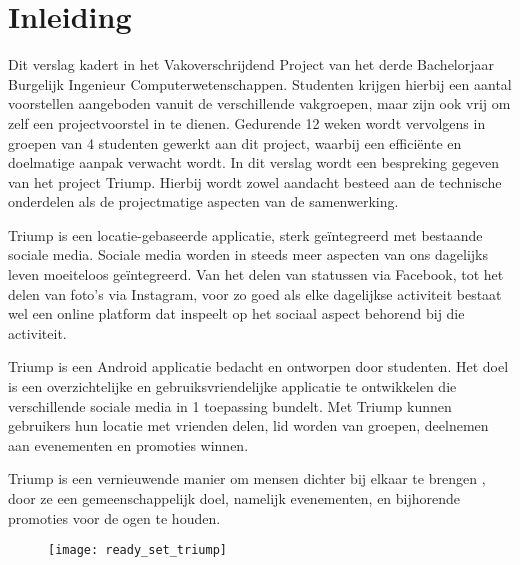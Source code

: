 \chapter{Inleiding}
Dit verslag kadert in het Vakoverschrijdend Project van het derde Bachelorjaar Burgelijk Ingenieur Computerwetenschappen. Studenten krijgen hierbij een aantal voorstellen aangeboden vanuit de verschillende vakgroepen, maar zijn ook vrij om zelf een projectvoorstel in te dienen. Gedurende 12 weken wordt vervolgens in groepen van 4 studenten gewerkt aan dit project, waarbij een efficiënte en doelmatige aanpak verwacht wordt. In dit verslag wordt een bespreking gegeven van het project Triump. Hierbij wordt zowel aandacht besteed aan de technische onderdelen als de projectmatige aspecten van de samenwerking.


Triump is een locatie-gebaseerde applicatie, sterk geïntegreerd met bestaande sociale media.
Sociale media worden in steeds meer aspecten van ons dagelijks leven moeiteloos geïntegreerd. Van het delen van statussen via Facebook, tot het delen van foto’s via Instagram, voor zo goed als elke dagelijkse activiteit bestaat wel een online platform dat inspeelt op het sociaal aspect behorend bij die activiteit.

Triump is een Android applicatie bedacht en ontworpen door studenten. Het doel is een overzichtelijke en gebruiksvriendelijke applicatie te ontwikkelen die verschillende sociale media in 1 toepassing bundelt. Met Triump kunnen gebruikers hun locatie met vrienden delen, lid worden van groepen, deelnemen aan evenementen en promoties winnen.

Triump is een vernieuwende manier om mensen dichter bij elkaar te brengen%
, door ze een gemeenschappelijk doel, namelijk evenementen, en bijhorende promoties voor de ogen te houden.


\begin{figure}[H]
	\centering
	\texttt{[image: ready\_set\_triump]}
	\label{fig:inleiding}
	
\end{figure}
